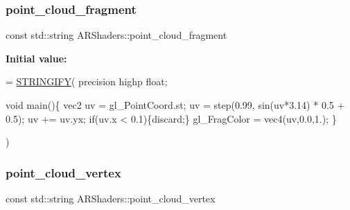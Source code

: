 \subsubsection{\texorpdfstring{point\+\_\+cloud\+\_\+fragment}{point\_cloud\_fragment}}
{\footnotesize\ttfamily const std\+::string A\+R\+Shaders\+::point\+\_\+cloud\+\_\+fragment}

{\bfseries Initial value\+:}
\begin{DoxyCode}
= \mbox{\hyperlink{_a_r_shaders_8h_ab06e1eb2e9bf38e0d452b1f796aed208}{STRINGIFY}}(
                                                   precision highp \textcolor{keywordtype}{float};
                                                   
                                                   
                                                   
                                                   
                                                   \textcolor{keywordtype}{void} main()\{
                                                       vec2 uv = gl\_PointCoord.st;
                                                       uv = step(0.99, sin(uv*3.14) * 0.5 + 0.5);
                                                       uv += uv.yx;
                                                       \textcolor{keywordflow}{if}(uv.x < 0.1)\{discard;\}
                                                       gl\_FragColor = vec4(uv,0.0,1.);
                                                   \}
                                                   
                                                   
                                                   
                                                   )
\end{DoxyCode}
\mbox{\label{namespace_a_r_shaders_ada1162901271506088cc985d466c8971}} 
\subsubsection{\texorpdfstring{point\+\_\+cloud\+\_\+vertex}{point\_cloud\_vertex}}
{\footnotesize\ttfamily const std\+::string A\+R\+Shaders\+::point\+\_\+cloud\+\_\+vertex}

